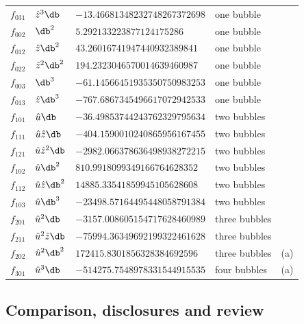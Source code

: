 {\begin{longtable}{@{}lllll@{}}
$f_{031}$ & $\hat z^3\db$ & $-13.46681348232748267372698$ & one bubble & \\
$f_{002}$ & $\db^2$ & $5.292133223877124175286$ & one bubble & \\
$f_{012}$ & $\hat z\db^2$ & $43.26016741947440932389841$ & one bubble & \\
$f_{022}$ & $\hat z^2\db^2$ & $194.2323046570014639460987$ & one bubble & \\
$f_{003}$ & $\db^3$ & $-61.14566451935350750983253$ & one bubble & \\
$f_{013}$ & $\hat z\db^3$ & $-767.6867345496617072942533$ & one bubble & \\
$f_{101}$ & $\hat u\db$ & $-36.49853744243762329795634$ & two bubbles & \\
$f_{111}$ & $\hat u\hat z\db$ & $-404.1590010240865956167455$ & two bubbles & \\
$f_{121}$ & $\hat u\hat z^2\db$ & $-2982.066378636498938272215$ & two bubbles & \\
$f_{102}$ & $\hat u\db^2$ & $810.9918099349166764628352$ & two bubbles & \\
$f_{112}$ & $\hat u\hat z\db^2$ & $14885.33541859945105628608$ & two bubbles & \\
$f_{103}$ & $\hat u\db^3$ & $-23498.57164495448058791384$ & two bubbles & \\
$f_{201}$ & $\hat u^2\db$ & $-3157.008605154717628460989$ & three bubbles & \\
$f_{211}$ & $\hat u^2\hat z\db$ & $-75994.36349692199322461628$ & three bubbles & \\
$f_{202}$ & $\hat u^2\db^2$ & $172415.8301856328384692596$ & three bubbles & (a)\\
$f_{301}$ & $\hat u^3\db$ & $-514275.7548978331544915535$ & four bubbles & (a)\\
\end{longtable}
}

\subsection{Comparison, disclosures and review}\label{sri:app:integ:disclosures}
